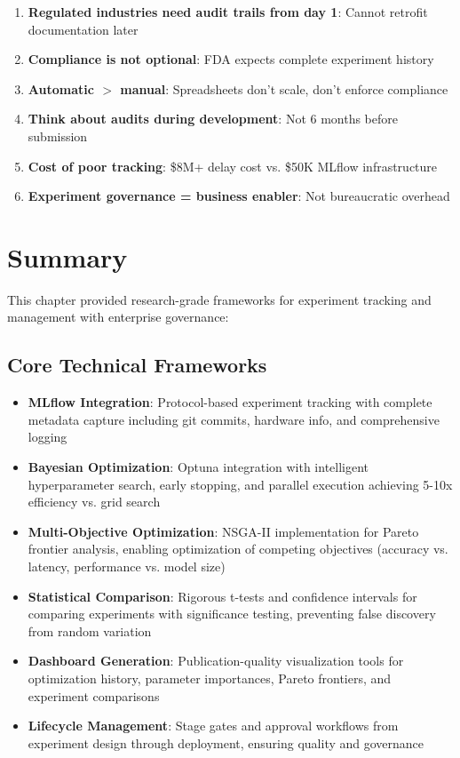 \begin{enumerate}
    \item \textbf{Regulated industries need audit trails from day 1}: Cannot retrofit documentation later
    \item \textbf{Compliance is not optional}: FDA expects complete experiment history
    \item \textbf{Automatic $>$ manual}: Spreadsheets don't scale, don't enforce compliance
    \item \textbf{Think about audits during development}: Not 6 months before submission
    \item \textbf{Cost of poor tracking}: \$8M+ delay cost vs. \$50K MLflow infrastructure
    \item \textbf{Experiment governance = business enabler}: Not bureaucratic overhead
\end{enumerate}

\section{Summary}

This chapter provided research-grade frameworks for experiment tracking and management with enterprise governance:

\subsection{Core Technical Frameworks}

\begin{itemize}
    \item \textbf{MLflow Integration}: Protocol-based experiment tracking with complete metadata capture including git commits, hardware info, and comprehensive logging

    \item \textbf{Bayesian Optimization}: Optuna integration with intelligent hyperparameter search, early stopping, and parallel execution achieving 5-10x efficiency vs. grid search

    \item \textbf{Multi-Objective Optimization}: NSGA-II implementation for Pareto frontier analysis, enabling optimization of competing objectives (accuracy vs. latency, performance vs. model size)

    \item \textbf{Statistical Comparison}: Rigorous t-tests and confidence intervals for comparing experiments with significance testing, preventing false discovery from random variation

    \item \textbf{Dashboard Generation}: Publication-quality visualization tools for optimization history, parameter importances, Pareto frontiers, and experiment comparisons

    \item \textbf{Lifecycle Management}: Stage gates and approval workflows from experiment design through deployment, ensuring quality and governance
\end{itemize}

